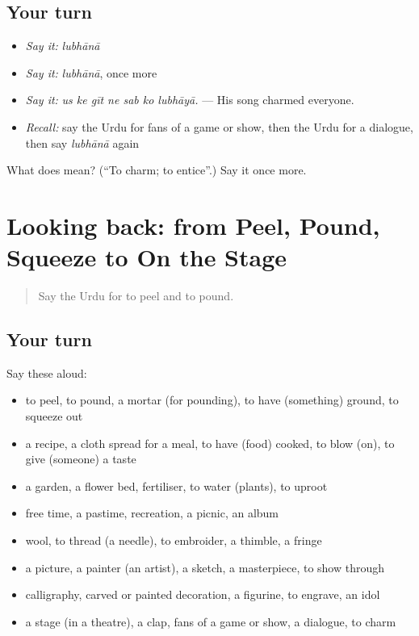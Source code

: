 \subsection*{Your turn}
\begin{itemize}
\raggedright
  \item \emph{Say it:} \emph{lubhānā}
  \item \emph{Say it:} \emph{lubhānā}, once more
  \item \emph{Say it:} \emph{us ke gīt ne sab ko lubhāyā.} — His song charmed everyone.
  \item \emph{Recall:} say the Urdu for fans of a game or show, then the Urdu for a dialogue, then say \emph{lubhānā} again
\end{itemize}

\begin{tcolorbox}[breakable,colback=teal!4,colframe=teal!35!black,title={Before you move on}]
What does  mean? (\textquotedblleft{}To charm; to entice\textquotedblright{}.) Say it once more.
\end{tcolorbox}
\section[(dialogue)]{Looking back: from Peel, Pound, Squeeze to On the Stage}

\label{lesson:UR-R517-review-510-517}



\begin{quote}
Say the Urdu for to peel and to pound.
\end{quote}

\subsection*{Your turn}
Say these aloud:

\begin{itemize}
\raggedright
  \item to peel, to pound, a mortar (for pounding), to have (something) ground, to squeeze out
  \item a recipe, a cloth spread for a meal, to have (food) cooked, to blow (on), to give (someone) a taste
  \item a garden, a flower bed, fertiliser, to water (plants), to uproot
  \item free time, a pastime, recreation, a picnic, an album
  \item wool, to thread (a needle), to embroider, a thimble, a fringe
  \item a picture, a painter (an artist), a sketch, a masterpiece, to show through
  \item calligraphy, carved or painted decoration, a figurine, to engrave, an idol
  \item a stage (in a theatre), a clap, fans of a game or show, a dialogue, to charm
\end{itemize}

